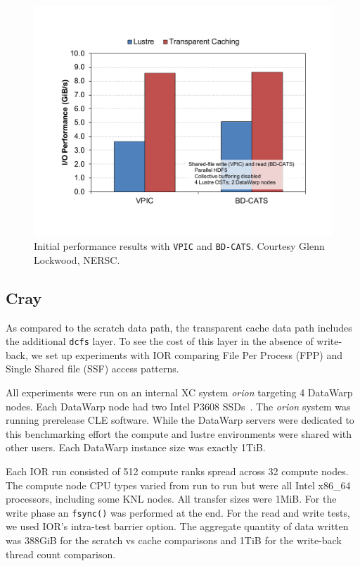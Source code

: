 \documentclass[10pt, conference, compsocconf]{IEEEtran}
\begin{document}
\begin{figure}
\centering
\includegraphics[width=\textwidth]{graphics/vpic}
\caption{Initial performance results with \texttt{VPIC} and \texttt{BD-CATS}. Courtesy Glenn Lockwood, NERSC.\label{vpic}}
\end{figure}

\subsection{Cray}

As compared to the scratch data path, the transparent cache data path includes the additional \texttt{dcfs} layer.  To see the cost of this layer in the absence of write-back, we set up experiments with IOR comparing File Per Process (FPP) and Single Shared file (SSF) access patterns.

All experiments were run on an internal XC system \emph{orion} targeting 4 DataWarp nodes.  Each DataWarp node had two Intel P3608 SSDs~\cite{intel-p3608}.  The \emph{orion} system was running prerelease CLE software.  While the DataWarp servers were dedicated to this benchmarking effort the compute and lustre environments were shared with other users.  Each DataWarp instance size was exactly 1TiB.

Each IOR run consisted of 512 compute ranks spread across 32 compute nodes.  The compute node CPU types varied from run to run but were all Intel x86\_64 processors, including some KNL nodes.  All transfer sizes were 1MiB.  For the write phase an \texttt{fsync()} was performed at the end.  For the read and write tests, we used IOR's intra-test barrier option.  The aggregate quantity of data written was 388GiB for the scratch vs cache comparisons and 1TiB for the write-back thread count comparison.
\end{document}
